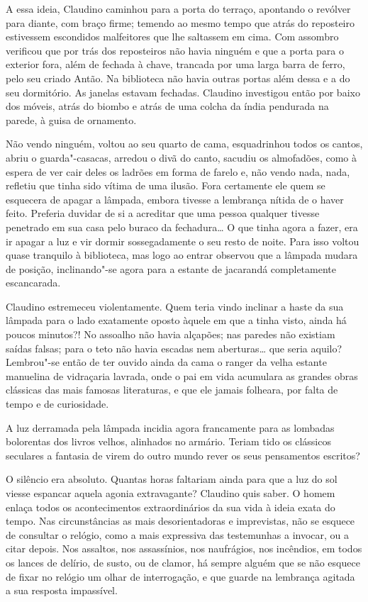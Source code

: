 A essa ideia, Claudino caminhou para a porta do terraço, apontando o
revólver para diante, com braço firme; temendo ao mesmo tempo que atrás
do reposteiro estivessem escondidos malfeitores que lhe saltassem em
cima. Com assombro verificou que por trás dos reposteiros não havia
ninguém e que a porta para o exterior fora, além de fechada à chave,
trancada por uma larga barra de ferro, pelo seu criado Antão. Na
biblioteca não havia outras portas além dessa e a do seu dormitório. As
janelas estavam fechadas. Claudino investigou então por baixo dos
móveis, atrás do biombo e atrás de uma colcha da índia pendurada na
parede, à guisa de ornamento.

Não vendo ninguém, voltou ao seu quarto de cama, esquadrinhou todos os
cantos, abriu o guarda"-casacas, arredou o divã do canto, sacudiu os
almofadões, como à espera de ver cair deles os ladrões em forma de
farelo e, não vendo nada, nada, refletiu que tinha sido vítima de uma
ilusão. Fora certamente ele quem se esquecera de apagar a lâmpada,
embora tivesse a lembrança nítida de o haver feito. Preferia duvidar de
si a acreditar que uma pessoa qualquer tivesse penetrado em sua casa
pelo buraco da fechadura\ldots{} O que tinha agora a fazer, era ir apagar a
luz e vir dormir sossegadamente o seu resto de noite. Para isso voltou
quase tranquilo à biblioteca, mas logo ao entrar observou que a lâmpada
mudara de posição, inclinando"-se agora para a estante de jacarandá
completamente escancarada.

Claudino estremeceu violentamente. Quem teria vindo inclinar a haste da
sua lâmpada para o lado exatamente oposto àquele em que a tinha visto,
ainda há poucos minutos?! No assoalho não havia alçapões; nas paredes
não existiam saídas falsas; para o teto não havia escadas nem
aberturas\ldots{} que seria aquilo? Lembrou"-se então de ter ouvido ainda da
cama o ranger da velha estante manuelina de vidraçaria lavrada, onde o
pai em vida acumulara as grandes obras clássicas das mais famosas
literaturas, e que ele jamais folheara, por falta de tempo e de
curiosidade.

A luz derramada pela lâmpada incidia agora francamente para as lombadas
bolorentas dos livros velhos, alinhados no armário. Teriam tido os
clássicos seculares a fantasia de virem do outro mundo rever os seus
pensamentos escritos?

O silêncio era absoluto. Quantas horas faltariam ainda para que a luz do
sol viesse espancar aquela agonia extravagante? Claudino quis saber. O
homem enlaça todos os acontecimentos extraordinários da sua vida à ideia
exata do tempo. Nas circunstâncias as mais desorientadoras e
imprevistas, não se esquece de consultar o relógio, como a mais
expressiva das testemunhas a invocar, ou a citar depois. Nos assaltos,
nos assassínios, nos naufrágios, nos incêndios, em todos os lances de
delírio, de susto, ou de clamor, há sempre alguém que se não esquece de
fixar no relógio um olhar de interrogação, e que guarde na lembrança
agitada a sua resposta impassível.

